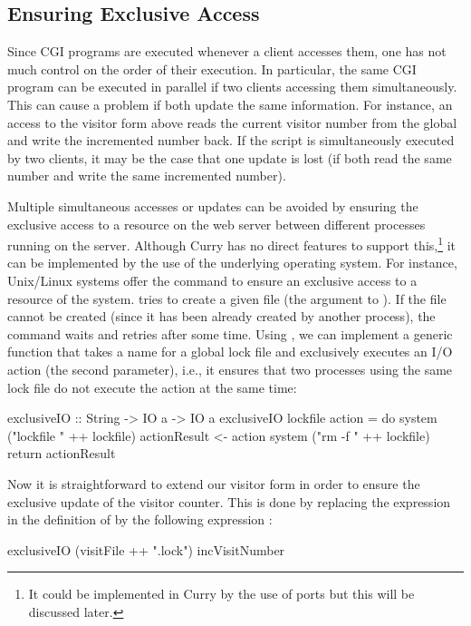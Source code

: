 \subsection{Ensuring Exclusive Access}
\label{sec-exclusiveIO}

Since CGI programs are executed whenever a client accesses them,
one has not much control on the order of their execution.
In particular, the same CGI program can be executed
in parallel if two clients accessing them simultaneously.
This can cause a problem if both update the same information.
For instance, an access to the visitor form above
reads the current visitor number from the global 
and write the incremented number back.
If the script is simultaneously executed by two clients,
it may be the case that one update is lost (if both read the same
number and write the same incremented number).

Multiple simultaneous accesses or updates can be avoided
by ensuring the exclusive access to a resource on the web server
between different processes running on the server.
Although Curry has no direct features to support this,\footnote{%
It could be implemented in Curry by the use of ports but this
will be discussed later.}
it can be implemented by the use of the underlying
operating system. For instance, Unix/Linux systems
offer the command  to ensure
an exclusive access to a resource of the system.
 tries to create
a given file (the argument to ).
If the file cannot be created (since it has been already created
by another process), the  command waits
and retries after some time.
Using , we can implement a generic function
 that takes a name for a global lock file
and exclusively executes an I/O action (the second parameter),
i.e., it ensures that two processes using the same lock file
do not execute the action at the same time:
%
\begin{prog}
exclusiveIO :: String -> IO a -> IO a
exclusiveIO lockfile action = do
  system ("lockfile " ++ lockfile)
  actionResult <- action
  system ("rm -f " ++ lockfile)
  return actionResult
\end{prog}
%
Now it is straightforward to extend our visitor form
in order to ensure the exclusive update of the visitor counter.
This is done by replacing the expression 
in the definition of  by the following
expression :
%
\begin{prog}
exclusiveIO (visitFile ++ ".lock") incVisitNumber
\end{prog}


